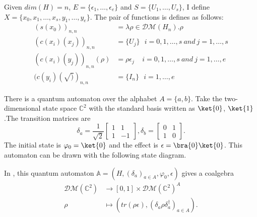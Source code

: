 \documentclass{llncs}
\newcommand{\C}{\mathbb{C}}
\newcommand{\half}{\frac{1}{\sqrt{2}}}
\begin{document}
Given $dim(H)=n$, $E=\{\epsilon_{1},\dots,\epsilon_{e}\}$ and
$S=\{U_1,\dots,U_s\}$, I define
$X=\{x_0,x_1,\dots,x_s,y_1,\dots,y_e\}$. The pair of functions is
defines as follows:
$$
\begin{aligned}
(s(x_0))_{n,n}&=\lambda \rho\in \mathcal{DM}(H_n). \rho\\
(c(x_i)(x_j))_{n,n}&=\{U_j\}\ \ \ i=0,1,\dots,s\ and\ j=1,\dots,s\\
(c(x_i)(y_j))_{n,n}(\rho)&=\rho \epsilon_{j}\ \ \ \ \ i=0,1,\dots,s\ and\ j=1,\dots,e\\
(c(y_i)(\surd))_{n,n}&=\{I_n\}\ \ \ i=1,\dots,e
\end{aligned}
$$

\begin{example}[\cite{F12}]
  There is a quantum automaton over the alphabet $A=\{a,b\}$. Take the
  two-dimensional state space $\C^{2}$ with the standard basis written
  as $\ket{0}$, $\ket{1}$.The transition matrices are
$$
\delta_a=\half\begin{bmatrix}
1&1 \\
1&-1
\end{bmatrix}, 
\delta_b=\begin{bmatrix}
0&1\\
1&0
\end{bmatrix}.
$$
The initial state is $\varphi_0=\ket{0}$ and the effect is
$\epsilon=\bra{0}\ket{0}$. This automaton can be drawn with the
following state diagram.

\begin{center}
\end{center} 

In \cite{F12}, this quantum automaton $\mathbb{A}=(H,(\delta_a)_{a\in A},\varphi_0,\epsilon)$ gives a coalgebra
$$
\begin{aligned}
\mathcal{DM}(\C^2)&\rightarrow [0,1]\times \mathcal{DM}(\C^2)^{A}\\
\rho&\mapsto(tr(\rho\epsilon),(\delta_a\rho\delta_a^{\dagger})_{a\in A}).
\end{aligned}$$ 


\end{example}
\end{document}
